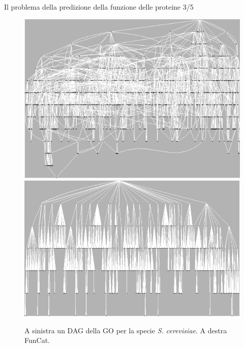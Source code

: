 \documentclass{beamer}
\begin{document}
\begin{tframe}{\small Il problema della predizione della funzione delle proteine  3/5}
\begin{figure}[h]
\center
\includegraphics[scale=0.25]{./img/GO.png}
\includegraphics[scale=0.24]{./img/FunCat.png}
\caption{\footnotesize{A sinistra un DAG della GO per la specie \emph{S. cerevisiae}. A destra FunCat.}}
\label{DAGTREE}
\end{figure}
\end{tframe}
\end{document}
